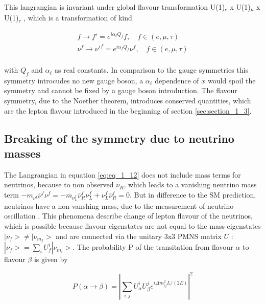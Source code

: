 This langrangian is invariant under global flavour transformation U(1)$_{e}$ x U(1)$_{\mu}$ x U(1)$_{\tau}$ \cite{LFV1, LFV2}, which is a transformation of kind 

\begin{equation}
	\label{eq:eq_1_13}
	\begin{split}
		f \rightarrow f' = e^{i\alpha_{\ell}Q_{f}}f, \quad f \in (e, \mu, \tau) \\
		\nu^{f} \rightarrow \nu'^{f} = e^{i\alpha_{f}Q_{f}}\nu^{f}, \quad f \in (e, \mu, \tau) \\
	\end{split}
\end{equation}

with $Q_{f}$ and $\alpha_{\ell}$ as real constants. In comparison to the gauge symmetries this symmetry introcudes no new gauge boson, a $\alpha_{\ell}$ dependence of $x$ would spoil the symmetry and cannot be fixed by a gauge boson introduction. The flavour symmetry, due to the Noether theorem, introduces conserved quantities, which are the lepton flavour introduced in the beginning of section \ref{sec:section_1_3}.


\subsection{Breaking of the symmetry due to neutrino masses}
\label{sec:section_1_3_2}

The Langrangian in equation \ref{eq:eq_1_12} does not include mass terms for neutrinos, because to non observed $\nu_R$, which leads to a vanishing neutrino mass term $-m_{\nu^{f}}\bar{\nu}^{f}\nu^{f} = -m_{\nu^{f}_{L}}\bar{\nu}^{f}_{R}\nu^{f}_{L} + {\nu}^{f}_{L}\bar{\nu}^{f}_{R} = 0$. But in difference to the \gls{SM} prediction, neutrinos have a non-vanshing mass, due to the measurement of neutrino oscillation \cite{NEUTRINOOSC}. This phenomena describe change of lepton flavour of the neutrinos, which is possible because flavour eigenstates are not equal to the mass eigenstates $|\nu_{f}> \neq |\nu_{m_{f}}>$ and are connected via the unitary 3x3 PMNS matrix $U$ \cite{PMNS}: $|\nu_{f}> =  \sum_{i} U^{i}_{f}|\nu_{m_{i}}>$. The probability P of the transitation from flavour $\alpha$ to flavour $\beta$ \cite{NEUTRINOPROB} is given by 

\begin{equation}
	\label{eq:eq_1_14}
	P(\alpha \rightarrow \beta) = |\sum_{i, j} U_{\alpha}^{i} U_{\beta}^{j} e^{i\Delta m^2_{ij}L/(2E)}|^2
\end{equation}

